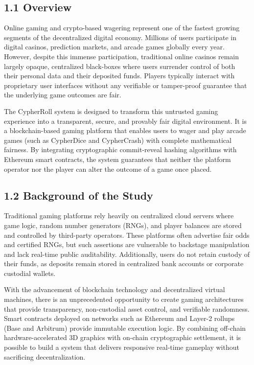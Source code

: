\newpage
{}
\setcounter{page}{1}

\par
\label{chap:intro}
\vspace{0.15cm}
\par
\vspace{0.3cm}

\subsection*{1.1 Overview}
Online gaming and crypto-based wagering represent one of the fastest growing segments of the decentralized digital economy. Millions of users participate in digital casinos, prediction markets, and arcade games globally every year. However, despite this immense participation, traditional online casinos remain largely opaque, centralized black-boxes where users surrender control of both their personal data and their deposited funds. Players typically interact with proprietary user interfaces without any verifiable or tamper-proof guarantee that the underlying game outcomes are fair.

The CypherRoll system is designed to transform this untrusted gaming experience into a transparent, secure, and provably fair digital environment. It is a blockchain-based gaming platform that enables users to wager and play arcade games (such as CypherDice and CypherCrash) with complete mathematical fairness. By integrating cryptographic commit-reveal hashing algorithms with Ethereum smart contracts, the system guarantees that neither the platform operator nor the player can alter the outcome of a game once placed.

\subsection*{1.2 Background of the Study}
Traditional gaming platforms rely heavily on centralized cloud servers where game logic, random number generators (RNGs), and player balances are stored and controlled by third-party operators. These platforms often advertise fair odds and certified RNGs, but such assertions are vulnerable to backstage manipulation and lack real-time public auditability. Additionally, users do not retain custody of their funds, as deposits remain stored in centralized bank accounts or corporate custodial wallets.

With the advancement of blockchain technology and decentralized virtual machines, there is an unprecedented opportunity to create gaming architectures that provide transparency, non-custodial asset control, and verifiable randomness. Smart contracts deployed on networks such as Ethereum and Layer-2 rollups (Base and Arbitrum) provide immutable execution logic. By combining off-chain hardware-accelerated 3D graphics with on-chain cryptographic settlement, it is possible to build a system that delivers responsive real-time gameplay without sacrificing decentralization.

